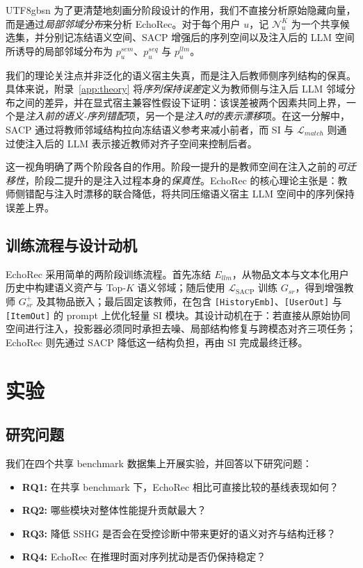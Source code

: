\documentclass{article}
\begin{document}
\begin{CJK*}{UTF8}{gbsn}
为了更清楚地刻画分阶段设计的作用，我们不直接分析原始隐藏向量，而是通过\emph{局部邻域分布}来分析 EchoRec。对于每个用户 $u$，记 $\mathcal{N}_u^K$ 为一个共享候选集，并分别记冻结语义空间、SACP 增强后的序列空间以及注入后的 LLM 空间所诱导的局部邻域分布为 $p_u^{sem}$、$p_u^{seq}$ 与 $p_u^{llm}$。

我们的理论关注点并非泛化的语义宿主失真，而是注入后教师侧序列结构的保真。具体来说，附录~\ref{app:theory} 将\emph{序列保持误差}定义为教师侧与注入后 LLM 邻域分布之间的差异，并在显式宿主兼容性假设下证明：该误差被两个因素共同上界，一个是\emph{注入前的语义-序列错配}项，另一个是\emph{注入时的表示漂移}项。在这一分解中，SACP 通过将教师邻域结构拉向冻结语义参考来减小前者，而 SI 与 $\mathcal{L}_{match}$ 则通过使注入后的 LLM 表示接近教师对齐子空间来控制后者。

这一视角明确了两个阶段各自的作用。阶段一提升的是教师空间在注入之前的\emph{可迁移性}，阶段二提升的是注入过程本身的\emph{保真性}。EchoRec 的核心理论主张是：教师侧错配与注入时漂移的联合降低，将共同压缩语义宿主 LLM 空间中的序列保持误差上界。

\subsection{训练流程与设计动机}

EchoRec 采用简单的两阶段训练流程。首先冻结 $E_{llm}$，从物品文本与文本化用户历史中构建语义资产与 Top-$K$ 语义邻域；随后使用 $\mathcal{L}_{\text{SACP}}$ 训练 $G_{sr}$，得到增强教师 $G_{sr}^{+}$ 及其物品嵌入；最后固定该教师，在包含 \texttt{[HistoryEmb]}、\texttt{[UserOut]} 与 \texttt{[ItemOut]} 的 prompt 上优化轻量 SI 模块。其设计动机在于：若直接从原始协同空间进行注入，投影器必须同时承担去噪、局部结构修复与跨模态对齐三项任务；EchoRec 则先通过 SACP 降低这一结构负担，再由 SI 完成最终迁移。

\section{实验}
\label{sec:experiment}

\subsection*{研究问题}

我们在四个共享 benchmark 数据集上开展实验，并回答以下研究问题：
\begin{itemize}[leftmargin=1.5em]
\item \textbf{RQ1:} 在共享 benchmark 下，EchoRec 相比可直接比较的基线表现如何？
\item \textbf{RQ2:} 哪些模块对整体性能提升贡献最大？
\item \textbf{RQ3:} 降低 SSHG 是否会在受控诊断中带来更好的语义对齐与结构迁移？
\item \textbf{RQ4:} EchoRec 在推理时面对序列扰动是否仍保持稳定？
\end{itemize}


\end{CJK*}
\end{document}
